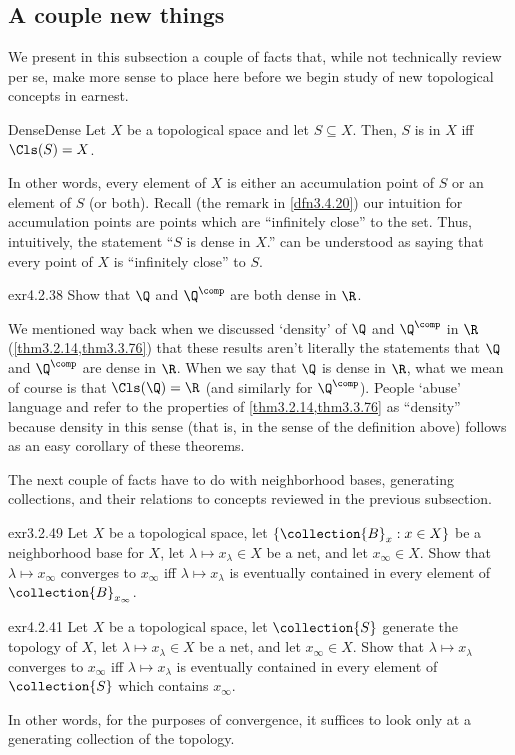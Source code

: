 \subsection{A couple new things}

We present in this subsection a couple of facts that, while not technically review per se, make more sense to place here before we begin study of new topological concepts in earnest.

\begin{dfn}{Dense}{Dense}
Let $X$ be a topological space and let $S\subseteq X$.  Then, $S$ is  in $X$ iff $\Cls (S)=X$.
\begin{rmk}
In other words, every element of $X$ is either an accumulation point of $S$ or an element of $S$ (or both).  Recall (the remark in \cref{dfn3.4.20}) our intuition for accumulation points are points which are ``infinitely close'' to the set.  Thus, intuitively, the statement ``$S$ is dense in $X$.'' can be understood as saying that every point of $X$ is ``infinitely close'' to $S$.
\end{rmk}
\end{dfn}
\begin{exr}{}{exr4.2.38}
Show that $\Q$ and $\Q ^{\comp}$ are both dense in $\R$.
\begin{rmk}
We mentioned way back when we discussed `density' of $\Q$ and $\Q ^{\comp}$ in $\R$ (\cref{thm3.2.14,thm3.3.76}) that these results aren't literally the statements that $\Q$ and $\Q ^{\comp}$ are dense in $\R$.  When we say that $\Q$ is dense in $\R$, what we mean of course is that $\Cls (\Q )=\R$ (and similarly for $\Q ^{\comp}$).  People `abuse' language and refer to the properties of \cref{thm3.2.14,thm3.3.76} as ``density'' because density in this sense (that is, in the sense of the definition above) follows as an easy corollary of these theorems.
\end{rmk}
\end{exr}

The next couple of facts have to do with neighborhood bases, generating collections, and their relations to concepts reviewed in the previous subsection.
\begin{exr}{}{exr3.2.49}
Let $X$ be a topological space, let $\left\{ \collection{B}_x:x\in X\right\}$ be a neighborhood base for $X$, let $\lambda \mapsto x_{\lambda}\in X$ be a net, and let $x_{\infty}\in X$.  Show that $\lambda \mapsto x_{\infty}$ converges to $x_{\infty}$ iff $\lambda \mapsto x_{\lambda}$ is eventually contained in every element of $\collection{B}_{x_{\infty}}$.
\end{exr}
\begin{exr}{}{exr4.2.41}
Let $X$ be a topological space, let $\collection{S}$ generate the topology of $X$, let $\lambda \mapsto x_\lambda \in X$ be a net, and let $x_\infty \in X$.  Show that $\lambda \mapsto x_\lambda$ converges to $x_\infty$ iff $\lambda \mapsto x_\lambda$ is eventually contained in every element of $\collection{S}$ which contains $x_\infty$.
\begin{rmk}
In other words, for the purposes of convergence, it suffices to look only at a generating collection of the topology.
\end{rmk}
\end{exr}

